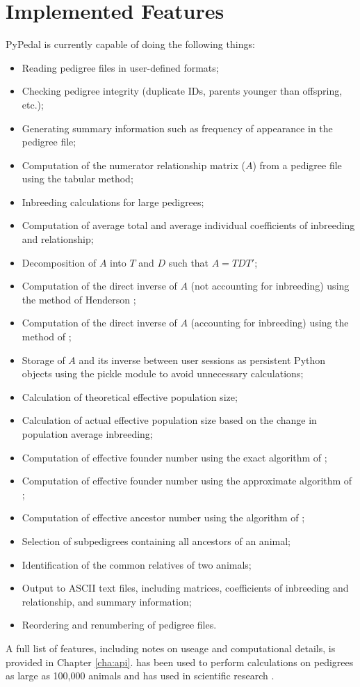\section{Implemented Features}
PyPedal is currently capable of doing the following things:
\begin{itemize}
\item Reading pedigree files in user-defined formats;
\item Checking pedigree integrity (duplicate IDs, parents younger than offspring, etc.);
\item Generating summary information such as frequency of appearance in the pedigree file;
\item Computation of the numerator relationship matrix ($A$) from a pedigree file using the tabular method;
\item Inbreeding calculations for large pedigrees;
\item Computation of average total and average individual coefficients of inbreeding and relationship;
\item Decomposition of $A$ into $T$ and $D$ such that $A=TDT'$;
\item Computation of the direct inverse of $A$ (not accounting for inbreeding) using the method of Henderson \cite{ref143};
\item Computation of the direct inverse of $A$ (accounting for inbreeding) using the method of ;
\item Storage of $A$ and its inverse between user sessions as persistent Python objects using the pickle module to avoid unnecessary calculations;
\item Calculation of theoretical effective population size;
\item Calculation of actual effective population size based on the change in population average inbreeding;
\item Computation of effective founder number using the exact algorithm of ;
\item Computation of effective founder number using the approximate algorithm of ;
\item Computation of effective ancestor number using the algorithm of ;
\item Selection of subpedigrees containing all ancestors of an animal;
\item Identification of the common relatives of two animals;
\item Output to ASCII text files, including matrices, coefficients of inbreeding and relationship, and summary information;
\item Reordering and renumbering of pedigree files.
\end{itemize}
A full list of features, including notes on useage and computational details, is provided in Chapter \ref{cha:api}.  \PYPEDAL{} has been used to perform calculations on pedigrees as large as 100,000 animals and has used in scientific research \cite{Cole2004a}.

